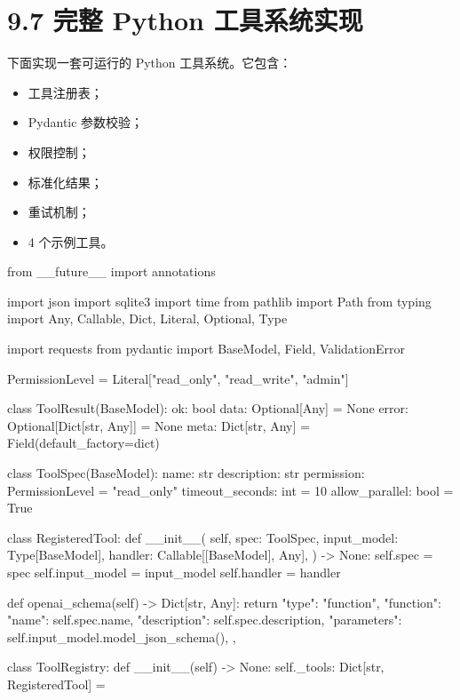 \section{9.7 完整 Python 工具系统实现}

下面实现一套可运行的 Python 工具系统。它包含：


\begin{itemize}[leftmargin=2em]
\item 工具注册表；
\item Pydantic 参数校验；
\item 权限控制；
\item 标准化结果；
\item 重试机制；
\item 4 个示例工具。
\end{itemize}

\begin{codeblock}
from __future__ import annotations

import json
import sqlite3
import time
from pathlib import Path
from typing import Any, Callable, Dict, Literal, Optional, Type

import requests
from pydantic import BaseModel, Field, ValidationError


PermissionLevel = Literal["read_only", "read_write", "admin"]


class ToolResult(BaseModel):
    ok: bool
    data: Optional[Any] = None
    error: Optional[Dict[str, Any]] = None
    meta: Dict[str, Any] = Field(default_factory=dict)


class ToolSpec(BaseModel):
    name: str
    description: str
    permission: PermissionLevel = "read_only"
    timeout_seconds: int = 10
    allow_parallel: bool = True


class RegisteredTool:
    def __init__(
        self,
        spec: ToolSpec,
        input_model: Type[BaseModel],
        handler: Callable[[BaseModel], Any],
    ) -> None:
        self.spec = spec
        self.input_model = input_model
        self.handler = handler

    def openai_schema(self) -> Dict[str, Any]:
        return {
            "type": "function",
            "function": {
                "name": self.spec.name,
                "description": self.spec.description,
                "parameters": self.input_model.model_json_schema(),
            },
        }


class ToolRegistry:
    def __init__(self) -> None:
        self._tools: Dict[str, RegisteredTool] = {}


\end{codeblock}
